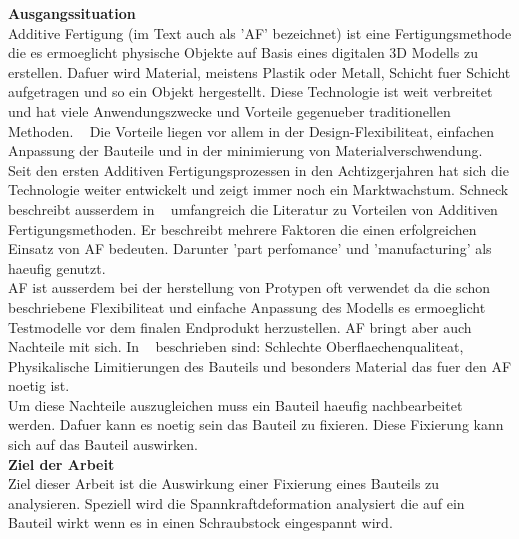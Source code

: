 \documentclass[../main.tex]{subfiles}
\begin{document}
\begin{flushleft}
    \textbf{Ausgangssituation}\\
    Additive Fertigung (im Text auch als 'AF' bezeichnet) ist eine Fertigungsmethode die es ermoeglicht 
    physische Objekte auf Basis eines digitalen 3D Modells zu erstellen. 
    Dafuer wird Material, meistens Plastik oder Metall, 
    Schicht fuer Schicht aufgetragen und so ein Objekt hergestellt.
    Diese Technologie ist weit verbreitet und hat viele Anwendungszwecke und 
    Vorteile gegenueber traditionellen Methoden. ~\cite{MEHRPOUYA202129}
    Die Vorteile liegen vor allem in der Design-Flexibiliteat, einfachen Anpassung der Bauteile 
    und in der minimierung von Materialverschwendung. ~\cite{MEHRPOUYA202129}
    \\
    Seit den ersten Additiven Fertigungsprozessen in den Achtizgerjahren
    hat sich die Technologie weiter entwickelt und zeigt immer noch ein Marktwachstum.
    Schneck beschreibt ausserdem in ~\cite{SCHNECK201919} umfangreich die Literatur zu Vorteilen von Additiven 
    Fertigungsmethoden. Er beschreibt mehrere Faktoren die einen erfolgreichen Einsatz von AF bedeuten.
    Darunter 'part perfomance' und 'manufacturing' als haeufig genutzt.
    \\
    AF ist ausserdem bei der herstellung von Protypen oft verwendet da die schon beschriebene Flexibiliteat 
    und einfache Anpassung des Modells es ermoeglicht Testmodelle vor dem finalen Endprodukt herzustellen.
    AF bringt aber auch Nachteile mit sich. In ~\cite{Kumbhar2018} beschrieben sind: 
    Schlechte Oberflaechenqualiteat, Physikalische Limitierungen des Bauteils und besonders Material
    das fuer den AF noetig ist.
    \\
    Um diese Nachteile auszugleichen muss ein Bauteil haeufig nachbearbeitet werden. Dafuer kann es noetig
    sein das Bauteil zu fixieren. Diese Fixierung kann sich auf das Bauteil auswirken.\\
    \newblock
    \textbf{Ziel der Arbeit}\\
    Ziel dieser Arbeit ist die Auswirkung einer Fixierung eines Bauteils zu analysieren.
    Speziell wird die Spannkraftdeformation analysiert die auf ein Bauteil wirkt wenn es in einen
    Schraubstock eingespannt wird.



    
    


    
    

    

    
\end{flushleft}
\end{document}
